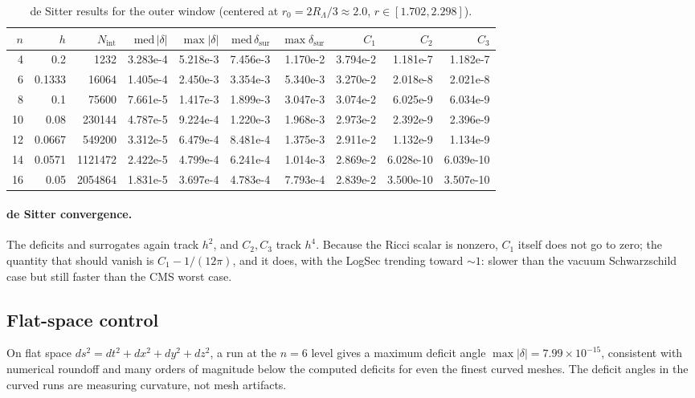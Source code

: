\documentclass[11pt,letterpaper]{article}
\begin{document}
\begin{table}[ht]\centering\small
\begin{tabular}{rrrrrrrrrr}
\toprule
$n$ & $h$ & $N_{\mathrm{int}}$ & $\mathrm{med}\,|\delta|$ & $\max|\delta|$ & $\mathrm{med}\,\delta_{\mathrm{sur}}$ & $\max\delta_{\mathrm{sur}}$ & $C_{1}$ & $C_{2}$ & $C_{3}$\\
\midrule
4 & 0.2 & 1232 & 3.283e-4 & 5.218e-3 & 7.456e-3 & 1.170e-2 & 3.794e-2 & 1.181e-7 & 1.182e-7\\
6 & 0.1333 & 16064 & 1.405e-4 & 2.450e-3 & 3.354e-3 & 5.340e-3 & 3.270e-2 & 2.018e-8 & 2.021e-8\\
8 & 0.1 & 75600 & 7.661e-5 & 1.417e-3 & 1.899e-3 & 3.047e-3 & 3.074e-2 & 6.025e-9 & 6.034e-9\\
10 & 0.08 & 230144 & 4.787e-5 & 9.224e-4 & 1.220e-3 & 1.968e-3 & 2.973e-2 & 2.392e-9 & 2.396e-9\\
12 & 0.0667 & 549200 & 3.312e-5 & 6.479e-4 & 8.481e-4 & 1.375e-3 & 2.911e-2 & 1.132e-9 & 1.134e-9\\
14 & 0.0571 & 1121472 & 2.422e-5 & 4.799e-4 & 6.241e-4 & 1.014e-3 & 2.869e-2 & 6.028e-10 & 6.039e-10\\
16 & 0.05 & 2054864 & 1.831e-5 & 3.697e-4 & 4.783e-4 & 7.793e-4 & 2.839e-2 & 3.500e-10 & 3.507e-10\\
\bottomrule
\end{tabular}
\caption{de Sitter results for the outer window (centered at $r_{0}=2R_{\Lambda}/3\approx 2.0$, $r\in[1.702,2.298]$).}
\label{tab:dsouter}
\end{table}

\paragraph{de Sitter convergence.} The deficits and surrogates again track $h^{2}$, and $C_{2},C_{3}$ track $h^{4}$. Because the Ricci scalar is nonzero, $C_{1}$ itself does not go to zero; the quantity that should vanish is $C_{1}-1/(12\pi)$, and it does, with the LogSec trending toward $\sim 1$: slower than the vacuum Schwarzschild case but still faster than the CMS worst case.

\subsection{Flat-space control}

On flat space $ds^{2}=dt^{2}+dx^{2}+dy^{2}+dz^{2}$, a run at the $n=6$ level gives a maximum deficit angle $\max|\delta|=7.99\times10^{-15}$, consistent with numerical roundoff and many orders of magnitude below the computed deficits for even the finest curved meshes. The deficit angles in the curved runs are measuring curvature, not mesh artifacts.
\end{document}
